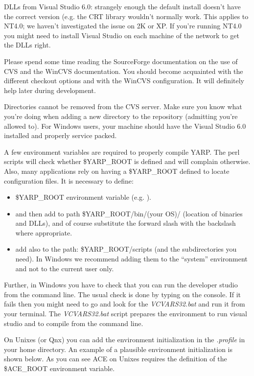 DLLs from Visual Studio 6.0: strangely enough the default install doesn't have the
correct version (e.g. the CRT library wouldn't normally work. This applies to
NT4.0; we haven't investigated the issue on 2K or XP. If you're running NT4.0 you might
need to install Visual Studio on each machine of the network to get the DLLs right.

Please spend some time reading the SourceForge documentation on the use of CVS and
the WinCVS documentation. You should become acquainted with the different checkout
options and with the WinCVS configuration. It will definitely help later during
development.

Directories cannot be removed from the CVS server. Make sure you know what
you're doing when adding a new directory to the repository (admitting you're allowed to).
For Windows users, your machine should have the Visual Studio 6.0 installed and properly
service packed.

A few environment variables are required to properly compile YARP. The perl scripts will check whether \$YARP\_ROOT is defined and will complain otherwise. Also, many applications rely on having a \$YARP\_ROOT defined to locate configuration files. It is necessary to define:
\begin{itemize}

\item \$YARP\_ROOT environment variable (e.g. ).

\item and then add to path \$YARP\_ROOT/bin/(your OS)/ (location of binaries and DLLs), and of course substitute the forward slash with the backslash where appropriate.

\item add also to the path: \$YARP\_ROOT/scripts (and the subdirectories you need). In Windows we recommend adding them to the ``system'' environment and not to the current user only.

\end{itemize}

Further, in Windows you have to check that you can run the developer studio from the command line. The usual check is done by typing  on the console. If it fails then you might need to go and look for the {\em VCVARS32.bat} and run it from your terminal. The {\em VCVARS32.bat} script prepares the environment to run visual studio and to compile from the command line.

On Unixes (or Qnx) you can add the environment initialization in the {\em .profile} in your home directory. An example of a plausible environment initialization is shown below. As you can see ACE on Unixes requires the definition of the \$ACE\_ROOT environment variable.

